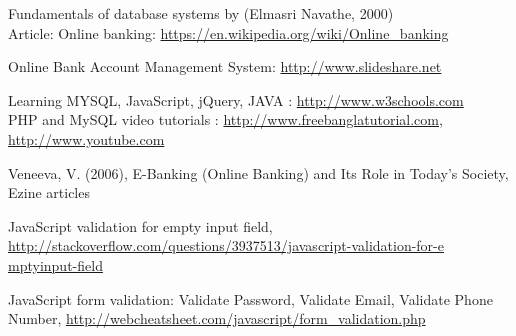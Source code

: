 \cleardoublepage
{}

\begin{thebibliography}{99}

\bibitem{}Fundamentals of database systems by (Elmasri Navathe, 2000)\\
Article: Online banking: \url{https://en.wikipedia.org/wiki/Online_banking}

\bibitem{} Online Bank Account Management System: \url{http://www.slideshare.net}

\bibitem{} Learning MYSQL, JavaScript, jQuery, JAVA : \url{http://www.w3schools.com}\\
PHP and MySQL video tutorials : \url{http://www.freebanglatutorial.com}, \url{http://www.youtube.com}

\bibitem{} Veneeva, V. (2006), E-Banking (Online Banking) and Its Role in Today's Society,
Ezine articles

\bibitem{} JavaScript validation for empty input field, \url{http://stackoverflow.com/questions/3937513/javascript-validation-for-e mptyinput-field}

\bibitem{} JavaScript form validation: Validate Password, Validate Email, Validate Phone
Number, \url{http://webcheatsheet.com/javascript/form_validation.php}
\end{thebibliography}

